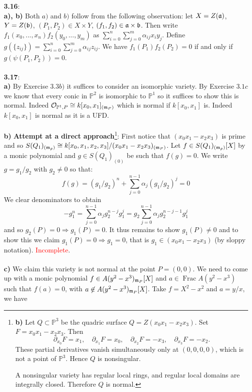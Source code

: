 \documentclass[12pt]{article}
\numberwithin{thm}{subsection}
\numberwithin{defn}{subsection}
\numberwithin{lemma}{subsection}
\numberwithin{example}{subsection}
\numberwithin{notation}{subsection}
\numberwithin{cor}{subsection}
\numberwithin{remark}{subsection}
\numberwithin{condition}{subsection}
\numberwithin{question}{subsection}
\numberwithin{construction}{subsection}
\numberwithin{construction}{subsection}
\numberwithin{construction}{subsection}
\newcommand{\bb}[1]{\mathbb{#1}}
\newcommand{\call}[1]{\mathcal{#1}}
\begin{document}
%
\textbf{3.16}:\\
%
\textbf{a), b)} Both $a)$ and $b)$ follow from the following observation: let $X = Z(\frak{a})$, $Y = Z(\frak{b})$, $(P_1,P_2) \in X \times Y$, $(f_1, f_2) \in \frak{a} \times \frak{b}$. Then write $f_1(x_0,...,x_n)f_2(y_0,...,y_m)$ as $\sum_{i = 0}^n\sum_{j = 0}^m \alpha_{ij}x_iy_j$. Define $g(\lbrace z_{ij}\rbrace) = \sum_{i = 0}^n\sum_{j = 0}^m \alpha_{ij}z_{ij}$. We have $f_1(P_1)f_2(P_2) = 0$ if and only if $g(\psi(P_1,P_2)) = 0$.\\\\
%
\textbf{3.17}:\\
\textbf{a)} By Exercise $3.3b)$ it suffices to consider an isomorphic variety. By Exercise $3.1c$ we know that every conic in $\bb{P}^2$ is isomorphic to $\bb{P}^1$ so it suffices to show this is normal. Indeed $\call{O}_{\bb{P}^1,P} \cong k[x_0,x_1]_{(\frak{m}_P)}$ which is normal if $k[x_0,x_1]$ is. Indeed $k[x_0,x_1]$ is normal as it is a UFD.\\\\
%
\textbf{b)} 
\textbf{Attempt at a direct approach}\footnote{\textbf{b)} Let $Q\subset \bb{P}^3$ be the quadric surface $Q=Z(x_0x_1-x_2x_3)$.
Set $F=x_0x_1-x_2x_3$.
Then
\[
\partial_{x_0}F=x_1,\quad \partial_{x_1}F=x_0,\quad \partial_{x_2}F=-x_3,\quad \partial_{x_3}F=-x_2.
\]
These partial derivatives vanish simultaneously only at $(0,0,0,0)$, which is not a point of $\bb{P}^3$.
Hence $Q$ is nonsingular.

A nonsingular variety has regular local rings, and regular local domains are integrally closed.
Therefore $Q$ is normal.}: First notice that $(x_0x_1 - x_2x_3)$ is prime and so $S(Q_1)_{(\frak{m}_p)} \cong k[x_0,x_1,x_2,x_3]/(x_0x_1 - x_2x_3)_{(\frak{m}_P)}$. Let $f \in S(Q_1)_{(\frak{m}_p)}[X]$ by a monic polynomial and $g \in S(Q_1)_{(0)}$ be such that $f(g) = 0$. We write $g = g_1/g_2$ with $g_2 \neq 0$ so that:
\[f(g) = (g_1/g_2)^n + \sum_{j = 0}^{n-1}\alpha_j (g_1/g_2)^j = 0\]
We clear denominators to obtain
\[-g_1^n = \sum_{j = 0}^{n-1}\alpha_j g_2^{n-j}g_1^j = g_2\sum_{j=0}^{n-1}\alpha_j g_2^{n-j-1}g_1^j\]
and so $g_2(P) = 0 \Rightarrow g_1(P) = 0$. It thus remains to show $g_1(P) \neq 0$ and to show this we claim $g_1(P) = 0 \Rightarrow g_1 = 0$, that is $g_1 \in (x_0x_1 - x_2x_3)$ (by sloppy notation). \textcolor{red}{Incomplete}.\\\\
%
\textbf{c)} We claim this variety is not normal at the point $P = (0,0)$. We need to come up with a monic polynomial $f \in A(y^2 - x^3)_{\frak{m}_P}[X]$ and $a \in \operatorname{Frac}A(y^2 - x^3)$ such that $f(a) = 0$, with $a \not\in A(y^2 - x^3)_{\frak{m}_P}[X]$. Take $f = X^2 - x^2$ and $a = y/x$, we have
\end{document}
